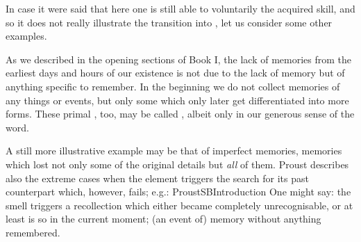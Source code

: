 In case it were said that here one is still able to voluntarily  the
acquired skill, and so it does not really illustrate the transition into
, let us consider some other examples. 

As we described in the opening sections of Book I, the lack of memories from the
earliest days and hours of our existence is not due to the lack of memory but of
anything specific to remember.  In the beginning we do not collect memories of
any  things or events, but only some   which only later
get differentiated into more  forms. These primal , too, may
be called , albeit only in our generous sense of the word.

A still more illustrative example may be that of imperfect memories, memories
which lost not only some of the original details but {\em all} of them.  Proust
describes also the extreme cases when the  element triggers the
search for its past counterpart which, however, fails; e.g.: \citet{[...] I
  sensed the smell of the cherries on the table and nothing else. [...] I could
  not, however, choose anything from the confused, known and forgotten
  impressions; eventually, after a short while, I ceased seeing anything and my
  memory for ever immersed itself in sleep.}{ProustSB}{Introduction}
One might say: the smell triggers a recollection which either became completely
unrecognisable, or at least is so in the current moment; (an event of) memory
without anything remembered.
  
